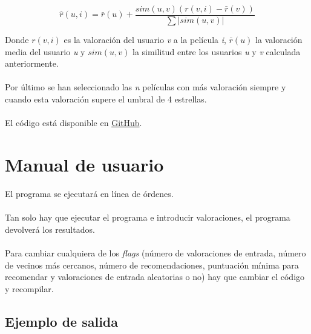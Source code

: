 \[ \hat{r}(u,i) = \bar{r}(u) + \frac{sim(u,v)(r(v,i)-\bar{r}(v))}{\sum|sim(u,v)|} \]

Donde $ r(v,i) $ es la valoración del usuario \textit{v} a la película \textit{i}, $ \bar{r}(u) $ la valoración media del usuario \textit{u} y $ sim(u,v) $ la similitud entre los usuarios \textit{u} y \textit{v} calculada anteriormente.
\\ \\
Por último se han seleccionado las \textit{n} películas con más valoración siempre y cuando esta valoración supere el umbral de 4 estrellas.
\\ \\
El código está disponible en \href{https://github.com/fblupi/master_informatica-GIW/tree/master/P3/InformationRetrievalSystem}{GitHub}.

\section{Manual de usuario}
\label{sec:manual}

El programa se ejecutará en línea de órdenes.
\\ \\
Tan solo hay que ejecutar el programa e introducir valoraciones, el programa devolverá los resultados.
\\ \\
Para cambiar cualquiera de los \textit{flags} (número de valoraciones de entrada, número de vecinos más cercanos, número de recomendaciones, puntuación mínima para recomendar y valoraciones de entrada aleatorias o no) hay que cambiar el código y recompilar.

\subsection{Ejemplo de salida}

